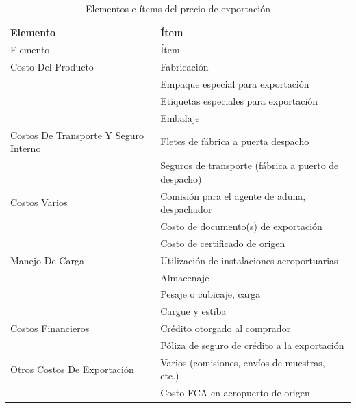 \documentclass[
  stu,
  floatsintext,
  longtable,
  a4paper,
  nolmodern,
  notxfonts,
  notimes,
  colorlinks=true,linkcolor=blue,citecolor=blue,urlcolor=blue]{apa7}
\begin{document}
\begin{longtable}[]{@{}
  >{\raggedright\arraybackslash}p{}
  >{\raggedright\arraybackslash}p{}@{}}
\caption{Elementos e ítems del precio de exportación}\tabularnewline
\toprule\noalign{}
\begin{minipage}[b]{\linewidth}\raggedright
Elemento
\end{minipage} & \begin{minipage}[b]{\linewidth}\raggedright
Ítem
\end{minipage} \\
\midrule\noalign{}
\endfirsthead
\toprule\noalign{}
\begin{minipage}[b]{\linewidth}\raggedright
Elemento
\end{minipage} & \begin{minipage}[b]{\linewidth}\raggedright
Ítem
\end{minipage} \\
\midrule\noalign{}
\endhead
\bottomrule\noalign{}
\endlastfoot
Costo Del Producto & Fabricación \\
& Empaque especial para exportación \\
& Etiquetas especiales para exportación \\
& Embalaje \\
Costos De Transporte Y Seguro Interno & Fletes de fábrica a puerta
despacho \\
& Seguros de transporte (fábrica a puerto de despacho) \\
Costos Varios & Comisión para el agente de aduna, despachador \\
& Costo de documento(s) de exportación \\
& Costo de certificado de origen \\
Manejo De Carga & Utilización de instalaciones aeroportuarias \\
& Almacenaje \\
& Pesaje o cubicaje, carga \\
& Cargue y estiba \\
Costos Financieros & Crédito otorgado al comprador \\
& Póliza de seguro de crédito a la exportación \\
Otros Costos De Exportación & Varios (comisiones, envíos de muestras,
etc.) \\
& Costo FCA en aeropuerto de origen \\
\end{longtable}
\end{document}
